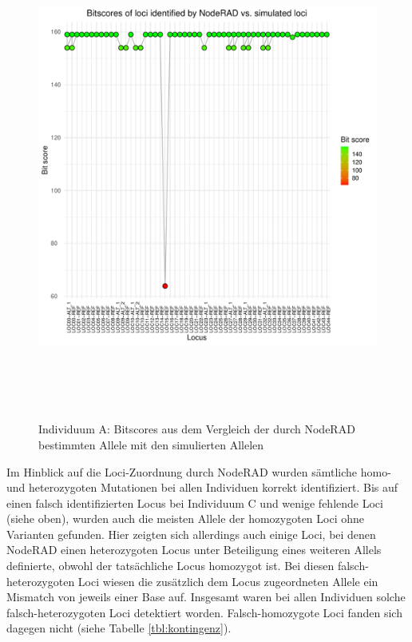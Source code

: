 \begin{figure}[H]
	\begin{center}
		\includegraphics[height=16cm]{bilder/evaluation/bitscores/A.plot_bitscores.pdf}
		\caption{Individuum A: Bitscores aus dem Vergleich der durch NodeRAD bestimmten Allele mit den simulierten Allelen}
		\label{fig:a-bitscore}
	\end{center}
\end{figure}

Im Hinblick auf die Loci-Zuordnung durch NodeRAD wurden sämtliche homo- und heterozygoten Mutationen bei allen Individuen korrekt identifiziert. Bis auf einen falsch identifizierten Locus bei Individuum C und wenige fehlende Loci (siehe oben), wurden auch die meisten Allele der homozygoten Loci ohne Varianten gefunden. Hier zeigten sich allerdings auch einige Loci, bei denen NodeRAD einen heterozygoten Locus unter Beteiligung eines weiteren Allels definierte, obwohl der tatsächliche Locus homozygot ist. Bei diesen falsch-heterozygoten Loci wiesen die zusätzlich dem Locus zugeordneten Allele ein Mismatch von jeweils einer Base auf. Insgesamt waren bei allen Individuen solche falsch-heterozygoten Loci detektiert worden. Falsch-homozygote Loci fanden sich dagegen nicht (siehe Tabelle \ref{tbl:kontingenz}).

